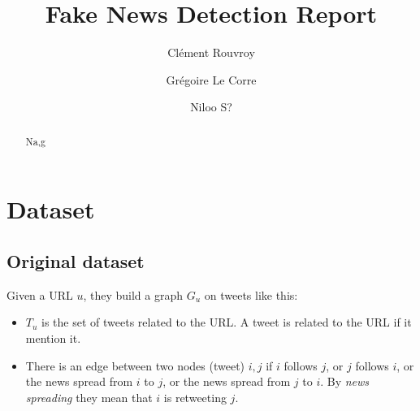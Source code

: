 \documentclass[sigconf]{acmart}
\begin{document}
\title{Fake News Detection Report}


\author{Clément Rouvroy}

\author{Grégoire Le Corre}
\authornotemark[1]


\author{Niloo S?}
\authornotemark[1]
\renewcommand{\shortauthors}{Le Corre, Rouvroy, S?}

\begin{abstract}
  Na,g
\end{abstract}





\maketitle

\section{Dataset}

\subsection{Original dataset}
Given a URL $u$, they build a graph $G_u$ on tweets like this:
\begin{itemize}
  \item $T_u$ is the set of tweets related to the URL. A tweet is related to the URL if it mention it.
  \item There is an edge between two nodes (tweet) $i,j$ if $i$ follows $j$, or $j$ follows $i$, or the news spread from $i$ to $j$, or the news spread from $j$ to $i$. By \emph{news spreading} they mean that $i$ is retweeting $j$.
\end{itemize}
\end{document}
